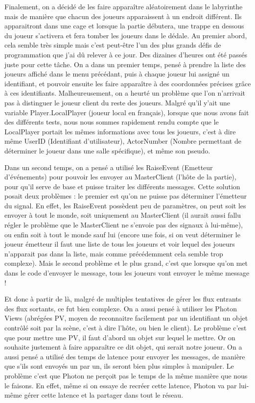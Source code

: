 \documentclass{article}
\begin{document}
 Finalement, on a décidé de les faire apparaître aléatoirement dans le labyrinthe mais de manière que chacun des joueurs apparaissent à un endroit différent. Ils apparaitront dans une cage et lorsque la partie débutera, une trappe en dessous du joueur s'activera et fera tomber les joueurs dans le dédale. Au premier abord, cela semble très simple mais c'est peut-être l'un des plus grands défis de programmation que j'ai dû relever à ce jour. Des dizaines d'heures ont été passés juste pour cette tâche.
On a dans un premier temps, pensé à prendre la liste des joueurs affiché dans le menu précédant, puis à chaque joueur lui assigné un identifiant, et pouvoir ensuite les faire apparaître à des coordonnées précises grâce à ces identifiants. Malheureusement, on a heurté un problème que l’on n’arrivait pas à distinguer le joueur client du reste des joueurs. Malgré qu'il y'ait une variable Player.LocalPlayer (joueur local en français), lorsque que nous avons fait des différents tests, nous nous sommes rapidement rendu compte que le LocalPlayer portait les mêmes informations avec tous les joueurs, c'est à dire même UserID (Identifiant d'utilisateur), ActorNumber (Nombre permettant de déterminer le joueur dans une salle spécifique), et même son pseudo. 

Dans un second temps, on a pensé a utilisé les RaiseEvent (Emetteur d'événements) pour pouvoir les envoyer au MasterClient (l'hôte de la partie), pour qu'il serve de base et puisse traiter les différents messages. Cette solution posait deux problèmes : le premier est qu'on ne puisse pas déterminer l'émetteur du signal. En effet, les RaiseEvent possèdent peu de paramètres, on peut soit les envoyer à tout le monde, soit uniquement au MasterClient (il aurait aussi fallu régler le problème que le MasterClient ne s'envoie pas des signaux à lui-même), ou enfin soit à tout le monde sauf lui (encore une fois, si on veut déterminer le joueur émetteur il faut une liste de tous les joueurs et voir lequel des joueurs n'apparait pas dans la liste, mais comme précédemment cela semble trop complexe). 
Mais le second problème et le plus grand, c'est que lorsque qu'on met dans le code d'envoyer le message, tous les joueurs vont envoyer le même message !

Et donc à partir de là, malgré de multiples tentatives de gérer les flux entrants des flux sortants, ce fut bien complexe. On a aussi pensé à utiliser les Photon Views (abrégées PV, moyen de reconnaitre facilement par un identifiant un objet contrôlé soit par la scène, c'est à dire l'hôte, ou bien le client). Le problème c'est que pour mettre une PV, il faut d'abord un objet sur lequel le mettre. Or on souhaite justement à faire apparaître ce dit objet, qui serait notre joueur.   
On a aussi pensé a utilisé des temps de latence pour envoyer les messages, de manière que s'ils sont envoyés un par un, ils seront bien plus simples à manipuler. Le problème c'est que Photon ne perçoit pas le temps de la même manière que nous le faisons. En effet, même si on essaye de recréer cette latence, Photon va par lui-même gérer cette latence et la partager dans tout le réseau. 
\end{document}
